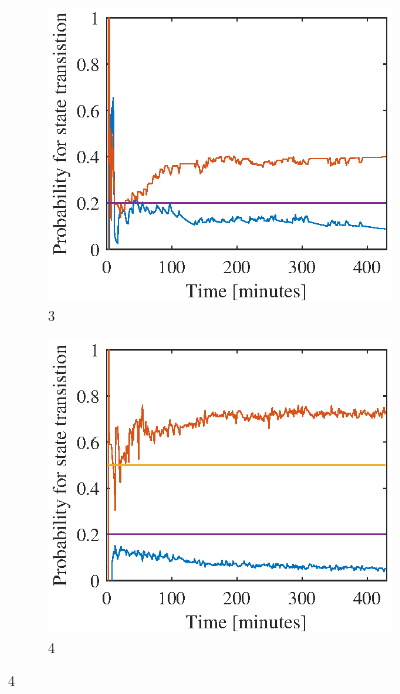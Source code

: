 \begin{figure}[htbp]
	\begin{subfigure}[t]{0.5\linewidth}
		\centering
		\includegraphics[width=1\linewidth]{chapters/appendix/figures/learning_curves/obs3}
		\caption{3}
	\end{subfigure}
	\hspace*{\fill}
	\begin{subfigure}[t]{0.5\linewidth}
		\centering
		\includegraphics[width=1\linewidth]{chapters/appendix/figures/learning_curves/obs4}
		\caption{4}
	\end{subfigure}
	

\end{figure}

